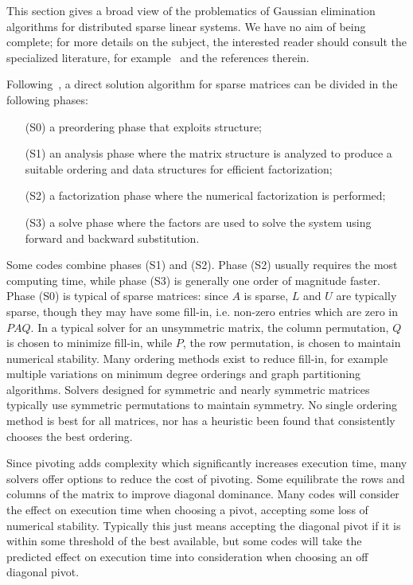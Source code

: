 \documentclass[acmtocl]{acmtrans2m}
\begin{document}
This section gives a broad view of the problematics of Gaussian elimination
algorithms for distributed sparse linear systems. We have no aim of being
complete; for more details on the subject, the interested reader should
consult the specialized literature, for
example~\cite{duff86direct,duff97sparse} and the references therein. 

\smallskip

Following~\cite[Chapter 6]{dongarra98numerical}, a direct solution algorithm
for sparse matrices can be divided in the following phases:
\begin{itemize}
\item[(S0)] a preordering phase that exploits structure;
\item[(S1)] an analysis phase where the matrix structure is analyzed to produce a
suitable ordering and data structures for efficient factorization;
\item[(S2)] a factorization phase where the numerical factorization is performed;
\item[(S3)] a solve phase where the factors are used to solve the system using
forward and backward substitution.
\end{itemize}
Some codes combine phases (S1) and (S2). Phase (S2) usually requires the most
computing time, while phase (S3) is generally one order of magnitude faster.
Phase (S0) is typical of sparse matrices:
since $A$ is sparse, $L$ and $U$ are typically sparse, though they may have some
fill-in, i.e. non-zero entries which are zero in $PAQ$.  
In a typical solver for an unsymmetric matrix, the column permutation,
$Q$ is chosen to minimize fill-in, while $P$, the row permutation, is
chosen to maintain numerical stability.  
Many ordering methods exist to reduce fill-in, for example multiple variations
on minimum degree orderings and graph partitioning algorithms.  Solvers
designed for symmetric and nearly symmetric matrices typically use symmetric
permutations to maintain symmetry.  No single ordering method is best for all
matrices, nor has a heuristic been found that consistently chooses the best
ordering\cite{BaumannFleischmannMutzbauer03,AmestoyDavisDuff03}. 

Since pivoting adds complexity which significantly increases execution
time, many solvers offer options to reduce the cost of pivoting\cite{LiDemmel509092,sg:04-fgcs}.  Some
equilibrate the rows and columns of the matrix to improve diagonal
dominance.  Many codes will consider the effect on execution time when
choosing a pivot, accepting some loss of numerical stability\cite{Malard126136}.
Typically this just means accepting the diagonal pivot if it is within
some threshold of the best available, but some codes will take the
predicted effect on execution time into consideration when choosing an off
diagonal pivot\cite{Davis992205}.
\end{document}
